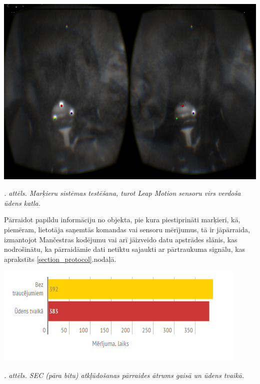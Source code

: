 \documentclass[12pt, a4paper, oneside, openright]{article}
\renewcommand{\thecimages}{\arabic{cimages}}
\begin{document}
\label{cimages:vapour.png}
\vspace{10pt}
\begin{samepage}
\begin{center}
\includegraphics[width=0.7\columnwidth]{images/vapour.png}
\begin{center}
\footnotesize{
\textit{\thecimages. attēls. Marķieru sistēmas testēšana, turot Leap Motion sensoru virs verdoša ūdens katla.}}
\end{center}
\end{center}
\end{samepage}


\newpage

\par
Pārraidot papildu informāciju no objekta, pie kura piestiprināti marķieri, kā, piemēram, lietotāja saņemtās komandas 
vai sensoru mērījumus, tā ir jāpārraida, izmantojot Mančestras kodējumu vai arī jāizveido datu apstrādes slānis,
kas nodrošinātu, ka pārraidāmie dati netiktu sajaukti ar pārtraukuma signālu, kas aprakstīts \ref{section_protocol}.nodaļā.

\label{cimages:merijumi_parity_tvaikaa.png}
\vspace{10pt}
\begin{samepage}
\begin{center}
\includegraphics[width=0.8\columnwidth]{images/merijumi_parity_tvaikaa.png}
\begin{center}
\footnotesize{
\textit{\thecimages. attēls. SEC (pāra bitu) atkļūdošanas pārraides ātrums gaisā un ūdens tvaikā.}}
\end{center}
\end{center}
\end{samepage}
\end{document}
